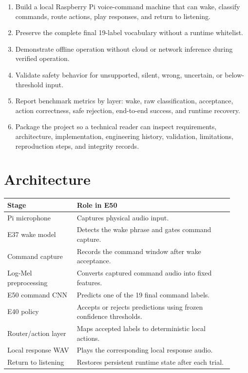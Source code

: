 \documentclass[11pt]{article}
\begin{document}
\begin{enumerate}
\item Build a local Raspberry Pi voice-command machine that can wake, classify commands, route actions, play responses, and return to listening.
\item Preserve the complete final 19-label vocabulary without a runtime whitelist.
\item Demonstrate offline operation without cloud or network inference during verified operation.
\item Validate safety behavior for unsupported, silent, wrong, uncertain, or below-threshold input.
\item Report benchmark metrics by layer: wake, raw classification, acceptance, action correctness, safe rejection, end-to-end success, and runtime recovery.
\item Package the project so a technical reader can inspect requirements, architecture, implementation, engineering history, validation, limitations, reproduction steps, and integrity records.
\end{enumerate}
\newpage
\section{Architecture}

\begin{longtable}{p{0.29\linewidth}p{0.63\linewidth}}
\toprule
\textbf{Stage} & \textbf{Role in E50} \\
\midrule
Pi microphone & Captures physical audio input. \\
E37 wake model & Detects the wake phrase and gates command capture. \\
Command capture & Records the command window after wake acceptance. \\
Log-Mel preprocessing & Converts captured command audio into fixed features. \\
E50 command CNN & Predicts one of the 19 final command labels. \\
E40 policy & Accepts or rejects predictions using frozen confidence thresholds. \\
Router/action layer & Maps accepted labels to deterministic local actions. \\
Local response WAV & Plays the corresponding local response audio. \\
Return to listening & Restores persistent runtime state after each trial. \\
\bottomrule
\end{longtable}
\end{document}
